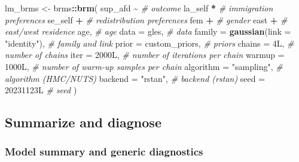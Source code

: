 \documentclass[
  11pt,
]{article}
\newenvironment{Shaded}{\begin{snugshade}}{\end{snugshade}}
\newcommand{\AttributeTok}[1]{\textcolor[rgb]{0.13,0.29,0.53}{#1}}
\newcommand{\CommentTok}[1]{\textcolor[rgb]{0.56,0.35,0.01}{\textit{#1}}}
\newcommand{\FunctionTok}[1]{\textcolor[rgb]{0.13,0.29,0.53}{\textbf{#1}}}
\newcommand{\NormalTok}[1]{#1}
\newcommand{\OtherTok}[1]{\textcolor[rgb]{0.56,0.35,0.01}{#1}}
\newcommand{\SpecialCharTok}[1]{\textcolor[rgb]{0.81,0.36,0.00}{\textbf{#1}}}
\newcommand{\StringTok}[1]{\textcolor[rgb]{0.31,0.60,0.02}{#1}}
\begin{document}
\begin{Shaded}
\begin{Highlighting}[]
\NormalTok{lm\_brms }\OtherTok{\textless{}{-}}\NormalTok{ brms}\SpecialCharTok{::}\FunctionTok{brm}\NormalTok{(}
\NormalTok{  sup\_afd }\SpecialCharTok{\textasciitilde{}}                              \CommentTok{\# outcome}
\NormalTok{    la\_self }\SpecialCharTok{*}                            \CommentTok{\# immigration preferences}
\NormalTok{    se\_self }\SpecialCharTok{+}                            \CommentTok{\# redistribution preferences}
\NormalTok{    fem }\SpecialCharTok{+}                                \CommentTok{\# gender}
\NormalTok{    east }\SpecialCharTok{+}                               \CommentTok{\# east/west residence}
\NormalTok{    age,                                 }\CommentTok{\# age}
  \AttributeTok{data =}\NormalTok{ gles,                           }\CommentTok{\# data}
  \AttributeTok{family =} \FunctionTok{gaussian}\NormalTok{(}\AttributeTok{link =} \StringTok{"identity"}\NormalTok{),  }\CommentTok{\# family and link}
  \AttributeTok{prior =}\NormalTok{ custom\_priors,                 }\CommentTok{\# priors}
  \AttributeTok{chains =}\NormalTok{ 4L,                           }\CommentTok{\# number of chains}
  \AttributeTok{iter =}\NormalTok{ 2000L,                          }\CommentTok{\# number of iterations per chain}
  \AttributeTok{warmup =}\NormalTok{ 1000L,                        }\CommentTok{\# number of warm{-}up samples per chain}
  \AttributeTok{algorithm =} \StringTok{"sampling"}\NormalTok{,                }\CommentTok{\# algorithm (HMC/NUTS)}
  \AttributeTok{backend =} \StringTok{"rstan"}\NormalTok{,                     }\CommentTok{\# backend (rstan)}
  \AttributeTok{seed =}\NormalTok{ 20231123L                       }\CommentTok{\# seed}
\NormalTok{)}
\end{Highlighting}
\end{Shaded}

\hypertarget{summarize-and-diagnose}{%
\subsection{Summarize and diagnose}\label{summarize-and-diagnose}}

\hypertarget{model-summary-and-generic-diagnostics}{%
\subsubsection{Model summary and generic diagnostics}\label{model-summary-and-generic-diagnostics}}
\end{document}
